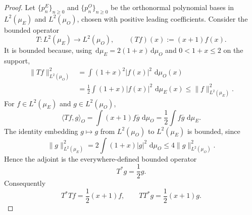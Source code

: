 \documentclass[preprint,12pt]{elsarticle}
\numberwithin{equation}{section}
\theoremstyle{plain}
\theoremstyle{definition}
\theoremstyle{remark}
\newcommand{\dd}{\,\mathrm d}
\begin{document}
\begin{proof}
Let $\{p_n^E\}_{n\ge0}$ and $\{p_n^O\}_{n\ge0}$ be the orthonormal polynomial bases in $L^2(\mu_E)$ and $L^2(\mu_O)$, chosen with positive leading coefficients.  Consider the bounded operator
\begin{equation}
T:L^2(\mu_E)\longrightarrow L^2(\mu_O),
\qquad
(Tf)(x):=(x+1)f(x).
\label{eq:Darboux_T_operator}
\end{equation}
It is bounded because, using $\dd\mu_E=2(1+x)\dd\mu_O$ and $0<1+x\le2$ on the support,
\begin{align}
\|Tf\|_{L^2(\mu_O)}^2
&=\int (1+x)^2|f(x)|^2\,\dd\mu_O(x)\\
&=\frac12\int (1+x)|f(x)|^2\,\dd\mu_E(x)
\le\|f\|_{L^2(\mu_E)}^2.
\end{align}
For $f\in L^2(\mu_E)$ and $g\in L^2(\mu_O)$,
\begin{equation}
\langle Tf,g\rangle_{O}
=\int (x+1)f\overline g\,\dd\mu_O
=\frac12\int f\overline g\,\dd\mu_E.
\end{equation}
The identity embedding $g\mapsto g$ from $L^2(\mu_O)$ to $L^2(\mu_E)$ is bounded, since
\begin{equation}
\|g\|_{L^2(\mu_E)}^2
=2\int(1+x)|g|^2\,\dd\mu_O
\le4\|g\|_{L^2(\mu_O)}^2.
\end{equation}
Hence the adjoint is the everywhere-defined bounded operator
\begin{equation}
T^*g=\frac12g.
\label{eq:Darboux_T_adjoint}
\end{equation}
Consequently
\begin{equation}
T^*Tf=\frac12(x+1)f,
\qquad
TT^*g=\frac12(x+1)g.
\label{eq:Darboux_operator_products}
\end{equation}


\end{proof}
\end{document}
